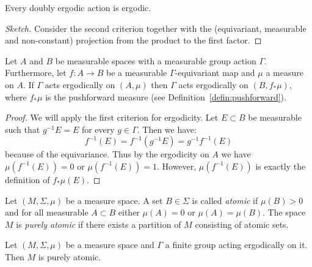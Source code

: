 \begin{prop}
  \label{prop:coeff-ergodic}
  Every doubly ergodic action is ergodic.
\end{prop}

\begin{proof}[Sketch]
  Consider the second criterion together with the (equivariant, measurable and non-constant) projection from the product to the first factor.
\end{proof}

\begin{lemma}
  \label{lemma:ergodicity-pushforward}
  Let \(A\) and \(B\) be measurable spaces with a measurable group action \(\Gamma\). Furthermore, let \(f\colon A \to B\) be a measurable \(\Gamma\)-equivariant map and \(\mu\) a measure on \(A\). If \(\Gamma\) acts ergodically on \((A, \mu)\) then \(\Gamma\) acts ergodically on \((B, f_\ast \mu)\), where \(f_\ast \mu\) is the pushforward measure (see Definition~\ref{defin:pushforward}).
\end{lemma}

\begin{proof}
  We will apply the first criterion for ergodicity. Let \(E \subset B\) be measurable such that \(g^{-1} E = E\) for every \(g \in \Gamma\). Then we have:
  \[
    f^{-1}(E) = f^{-1}(g^{-1}E) = g^{-1}f^{-1}(E)
  \]
  because of the equivariance. Thus by the ergodicity on \(A\) we have \(\mu(f^{-1}(E))= 0\) or \(\mu(f^{-1}(E)) = 1\). However, \(\mu(f^{-1}(E))\) is exactly the definition of \(f_\ast\mu(E)\).
\end{proof}

\begin{defin}
  \label{defin:atomic}
  Let \((M, \Sigma, \mu)\) be a measure space. A set \(B \in \Sigma\) is called \emph{atomic} if \(\mu(B) > 0\) and for all measurable \(A \subset B\) either \(\mu(A) = 0\) or \(\mu(A) = \mu(B)\). The space \(M\) is \emph{purely atomic} if there exists a partition of \(M\) consisting of atomic sets.
\end{defin}

\begin{lemma}
  \label{lem:ergodic-atomic}
  Let \((M, \Sigma, \mu)\) be a measure space and \(\Gamma\) a finite group acting ergodically on it. Then \(M\) is purely atomic.
\end{lemma}

